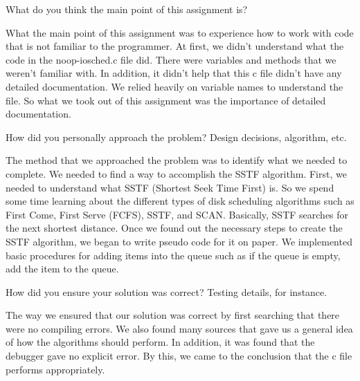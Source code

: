 \documentclass{article}
\newenvironment{question}[2][Question]{\begin{trivlist}
\item[\hskip \labelsep {\bfseries #1}\hskip \labelsep {\bfseries #2.}]}{\end{trivlist}}
\begin{document}
\begin{question}{1}
What do you think the main point of this assignment is?
\end{question}
What the main point of this assignment was to experience how to work with code that is not familiar to the programmer. At first, we didn’t understand what the code in the noop-iosched.c file did.  There were variables and methods that we weren’t familiar with. In addition, it didn’t help that this c file didn’t have any detailed documentation. We relied heavily on variable names to understand the file. So what we took out of this assignment was the importance of detailed documentation. 



\vspace{0.25in} %

\begin{question}{2}
How did you personally approach the problem? Design decisions, algorithm, etc.
\end{question}
The method that we approached the problem was to identify what we needed to complete. We needed to find a way to accomplish the SSTF algorithm. First, we needed to understand what SSTF (Shortest Seek Time First) is. So we spend some time learning about the different types of disk scheduling algorithms such as First Come, First Serve (FCFS), SSTF, and SCAN. Basically, SSTF searches for the next shortest distance. Once we found out the necessary steps to create the SSTF algorithm, we began to write pseudo code for it on paper. We implemented basic procedures for adding items into the queue such as if the queue is empty, add the item to the queue. 



\vspace{0.25in} %

\begin{question}{3}
How did you ensure your solution was correct? Testing details, for instance.
\end{question}
The way we ensured that our solution was correct by first searching that there were no compiling errors. We also found many sources that gave us a general idea of how the algorithms should perform. In addition, it was found that the debugger gave no explicit error. By this, we came to the conclusion that the c file performs appropriately.
\end{document}
